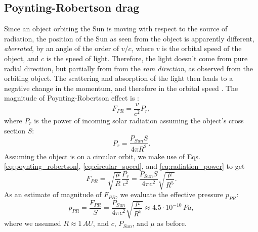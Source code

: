 \subsection{Poynting-Robertson drag} \label{ch:pr_drag}

Since an object orbiting the Sun is moving with respect to the source of radiation, the position of the Sun as seen from the object is apparently different, \textit{aberrated}, by an angle of the order of $v/c$, where $v$ is the orbital speed of the object, and $c$ is the speed of light. Therefore, the light doesn't come from pure radial direction, but partially from from the \textit{ram direction}, as observed from the orbiting object. The scattering and absorption of the light then leads to a negative change in the momentum, and therefore in the orbital speed \citep{poynting1903radiation}. The magnitude of Poynting-Robertson effect is \citep{robertson1937dynamical}:
\begin{equation}
    F_{PR} = \frac{v}{c^2} P_{r},
    \label{eq:poynting_robertson}
\end{equation}
where $P_r$ is the power of incoming solar radiation assuming the object's cross section $S$: 
\begin{equation}
    P_{r} = \frac{P_{Sun} S}{4 \pi R^2}.
    \label{eq:radiation_power}
\end{equation}
Assuming the object is on a circular orbit, we make use of Eqs. \ref{eq:poynting_robertson}, \ref{eq:circular_speed}, and \ref{eq:radiation_power} to get
\begin{equation}
    F_{PR} = \sqrt{\frac{\mu}{R}} \frac{P_{r}}{c^2} = \frac{P_{Sun}S}{4 \pi c^2} \sqrt{\frac{\mu}{R^5}}. 
\end{equation}
As an estimate of magnitude of $F_{PR}$, we evaluate the effective pressure $p_{PR}$:
\begin{equation}
    p_{PR} = \frac{F_{PR}}{S} = \frac{P_{Sun}}{4 \pi c^2} \sqrt{\frac{\mu}{R^5}} \approx 4.5 \cdot 10^{-10} \, \si{Pa},
\end{equation}
where we assumed $R \approx 1 \, \si{AU}$, and $c$, $P_{Sun}$, and $\mu$ as before.

